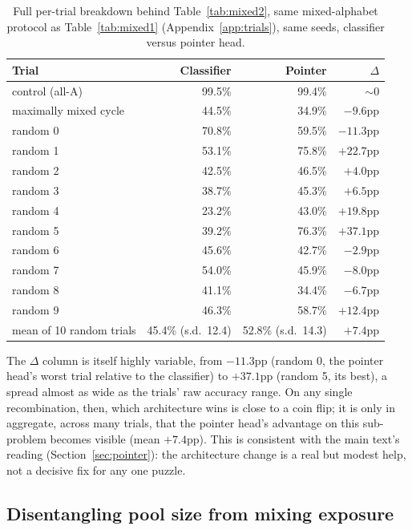 \documentclass{article} %
\begin{document}
\begin{table}[h]
\centering
\small
\begin{tabular}{lrrr}
\hline
Trial & Classifier & Pointer & $\Delta$ \\
\hline
control (all-A) & 99.5\% & 99.4\% & $\sim$0 \\
maximally mixed cycle & 44.5\% & 34.9\% & $-9.6$pp \\
random 0 & 70.8\% & 59.5\% & $-11.3$pp \\
random 1 & 53.1\% & 75.8\% & $+22.7$pp \\
random 2 & 42.5\% & 46.5\% & $+4.0$pp \\
random 3 & 38.7\% & 45.3\% & $+6.5$pp \\
random 4 & 23.2\% & 43.0\% & $+19.8$pp \\
random 5 & 39.2\% & 76.3\% & $+37.1$pp \\
random 6 & 45.6\% & 42.7\% & $-2.9$pp \\
random 7 & 54.0\% & 45.9\% & $-8.0$pp \\
random 8 & 41.1\% & 34.4\% & $-6.7$pp \\
random 9 & 46.3\% & 58.7\% & $+12.4$pp \\
\hline
mean of 10 random trials & 45.4\% (s.d.\ 12.4) & 52.8\% (s.d.\ 14.3) & $+7.4$pp \\
\hline
\end{tabular}
\caption{Full per-trial breakdown behind Table~\ref{tab:mixed2}, same
mixed-alphabet protocol as Table~\ref{tab:mixed1} (Appendix~\ref{app:trials}),
same seeds, classifier versus pointer head.}
\label{tab:mixed2-full}
\end{table}

The $\Delta$ column is itself highly variable, from $-11.3$pp (random 0,
the pointer head's worst trial relative to the classifier) to $+37.1$pp
(random 5, its best), a spread almost as wide as the trials' raw
accuracy range. On any single recombination, then, which architecture
wins is close to a coin flip; it is only in aggregate, across many
trials, that the pointer head's advantage on this sub-problem becomes
visible (mean $+7.4$pp). This is consistent with the main text's
reading (Section~\ref{sec:pointer}): the architecture change is a real
but modest help, not a decisive fix for any one puzzle.

\subsection{Disentangling pool size from mixing exposure}
\label{app:disentangle}
\end{document}
